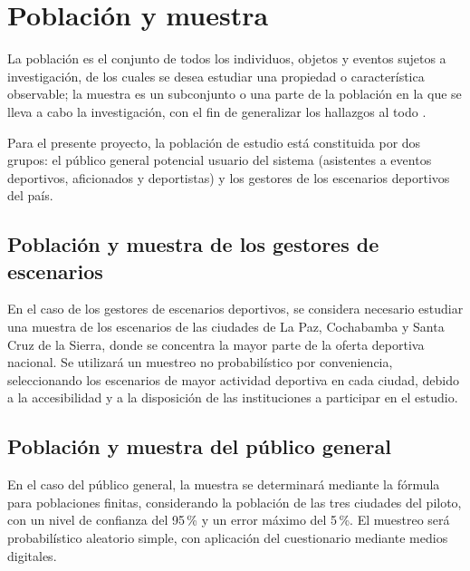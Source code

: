 
\section{Poblaci\'on y muestra}

La poblaci\'on es el conjunto de todos los individuos, objetos y eventos
sujetos a investigaci\'on, de los cuales se desea estudiar una propiedad o
caracter\'istica observable; la muestra es un subconjunto o una parte de la
poblaci\'on en la que se lleva a cabo la investigaci\'on, con el fin de
generalizar los hallazgos al todo \citep{hernandez2014}.

Para el presente proyecto, la poblaci\'on de estudio est\'a constituida por dos
grupos: el p\'ublico general potencial usuario del sistema
(asistentes a eventos deportivos, aficionados y deportistas) y los
gestores de los escenarios deportivos del pa\'is.

\subsection{Poblaci\'on y muestra de los gestores de escenarios}

En el caso de los gestores de escenarios deportivos, se considera necesario
estudiar una muestra de los escenarios de las ciudades de La Paz,
Cochabamba y Santa Cruz de la Sierra, donde se concentra la mayor parte de la
oferta deportiva nacional. Se utilizar\'a un muestreo no probabil\'istico por
conveniencia, seleccionando los escenarios de mayor actividad deportiva en
cada ciudad, debido a la accesibilidad y a la disposici\'on de las
instituciones a participar en el estudio.

\subsection{Poblaci\'on y muestra del p\'ublico general}

En el caso del p\'ublico general, la muestra se determinar\'a mediante la
f\'ormula para poblaciones finitas, considerando la poblaci\'on de las tres
ciudades del piloto, con un nivel de confianza del 95\,\% y un error m\'aximo
del 5\,\%. El muestreo ser\'a probabil\'istico aleatorio simple, con aplicaci\'on
del cuestionario mediante medios digitales.

